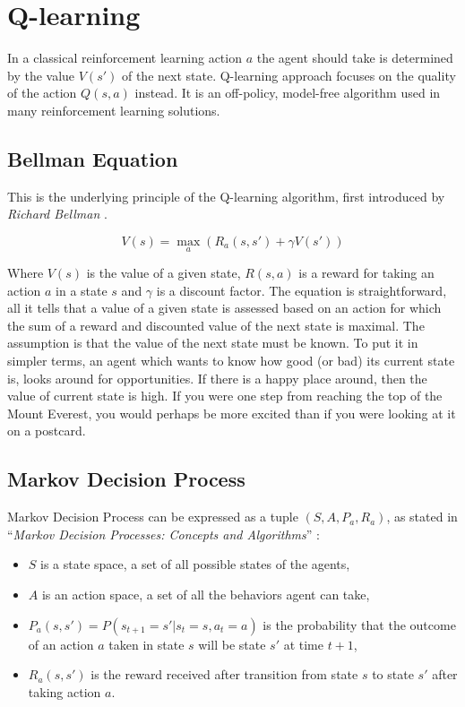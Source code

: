 \section{Q-learning}
\label{sec:q-learn}

In a classical reinforcement learning action $a$ the agent should take is determined by the value $V(s')$ of the next state. Q-learning approach focuses on the quality of the action $Q(s, a)$ instead. It is an off-policy, model-free algorithm used in many reinforcement learning solutions.

\subsection{Bellman Equation}
\label{sub:bellman-eq}

This is the underlying principle of the Q-learning algorithm, first introduced by \emph{Richard Bellman} \cite{Bellman:DynamicProgramming}.

\begin{equation}
    V(s) = \max_a\left(R_a(s, s') + \gamma V(s') \right)
\label{eq:bellman}
\end{equation}

Where $V(s)$ is the value of a given state, $R(s, a)$ is a reward for taking an action $a$ in a state $s$ and $\gamma$ is a discount factor. The equation is straightforward, all it tells that a value of a given state is assessed based on an action for which the sum of a reward and discounted value of the next state is maximal. The assumption is that the value of the next state must be known. To put it in simpler terms, an agent which wants to know how good (or bad) its current state is, looks around for opportunities. If there is a happy place around, then the value of current state is high. If you were one step from reaching the top of the Mount Everest, you would perhaps be more excited than if you were looking at it on a postcard.

\subsection{Markov Decision Process}
\label{sub:mdp}

Markov Decision Process can be expressed as a tuple $(S, A, P_a, R_a)$, as stated in ``\emph{Markov Decision Processes: Concepts and Algorithms}'' \cite{Otterlo2012MarkovDP}:

\begin{itemize}
    \item $S$ is a state space, a set of all possible states of the agents,
    \item $A$ is an action space, a set of all the behaviors agent can take,
    \item $P_a(s, s') = P(s_{t+1} = s' | s_t = s, a_t = a)$ is the probability that the outcome of an action $a$ taken in state $s$ will be state $s'$ at time $t+1$,
    \item $R_a(s, s')$ is the reward received after transition from state $s$ to state $s'$ after taking action $a$.
\end{itemize}

